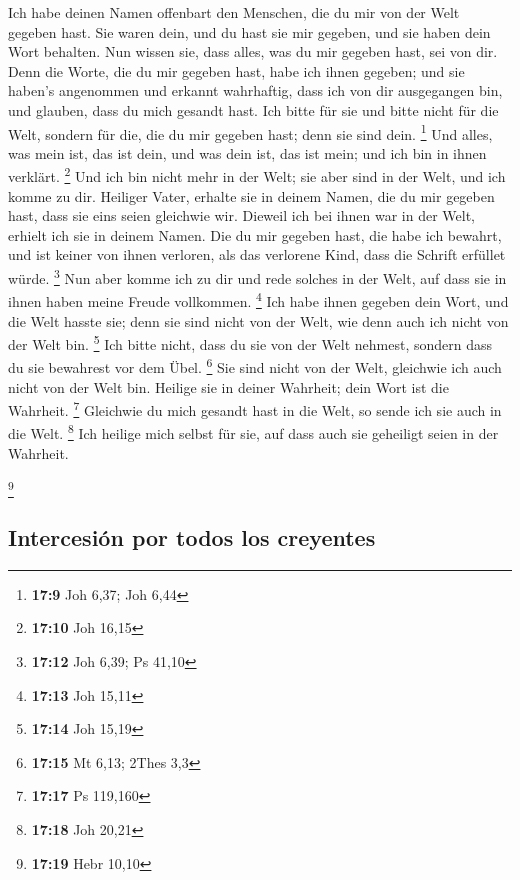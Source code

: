  Ich habe deinen Namen offenbart den Menschen, die du mir
von der Welt gegeben hast. Sie waren dein, und du hast sie mir gegeben,
und sie haben dein Wort behalten.  Nun wissen sie, dass
alles, was du mir gegeben hast, sei von dir.  Denn die
Worte, die du mir gegeben hast, habe ich ihnen gegeben; und sie haben's
angenommen und erkannt wahrhaftig, dass ich von dir ausgegangen bin, und
glauben, dass du mich gesandt hast.  Ich bitte für sie und
bitte nicht für die Welt, sondern für die, die du mir gegeben hast; denn
sie sind dein. \footnote{\textbf{17:9} Joh 6,37; Joh 6,44}
 Und alles, was mein ist, das ist dein, und was dein ist,
das ist mein; und ich bin in ihnen verklärt. \footnote{\textbf{17:10}
  Joh 16,15}  Und ich bin nicht mehr in der Welt; sie
aber sind in der Welt, und ich komme zu dir. Heiliger Vater, erhalte sie
in deinem Namen, die du mir gegeben hast, dass sie eins seien gleichwie
wir.  Dieweil ich bei ihnen war in der Welt, erhielt ich
sie in deinem Namen. Die du mir gegeben hast, die habe ich bewahrt, und
ist keiner von ihnen verloren, als das verlorene Kind, dass die Schrift
erfüllet würde. \footnote{\textbf{17:12} Joh 6,39; Ps 41,10}
 Nun aber komme ich zu dir und rede solches in der Welt,
auf dass sie in ihnen haben meine Freude vollkommen. \footnote{\textbf{17:13}
  Joh 15,11}  Ich habe ihnen gegeben dein Wort, und die
Welt hasste sie; denn sie sind nicht von der Welt, wie denn auch ich
nicht von der Welt bin. \footnote{\textbf{17:14} Joh 15,19}
 Ich bitte nicht, dass du sie von der Welt nehmest,
sondern dass du sie bewahrest vor dem Übel. \footnote{\textbf{17:15} Mt
  6,13; 2Thes 3,3}  Sie sind nicht von der Welt,
gleichwie ich auch nicht von der Welt bin.  Heilige sie
in deiner Wahrheit; dein Wort ist die Wahrheit. \footnote{\textbf{17:17}
  Ps 119,160}  Gleichwie du mich gesandt hast in die
Welt, so sende ich sie auch in die Welt. \footnote{\textbf{17:18} Joh
  20,21}  Ich heilige mich selbst für sie, auf dass auch
sie geheiligt seien in der Wahrheit.

\footnote{\textbf{17:19} Hebr 10,10}

\hypertarget{intercesiuxf3n-por-todos-los-creyentes}{%
\subsection{Intercesión por todos los
creyentes}\label{intercesiuxf3n-por-todos-los-creyentes}}

